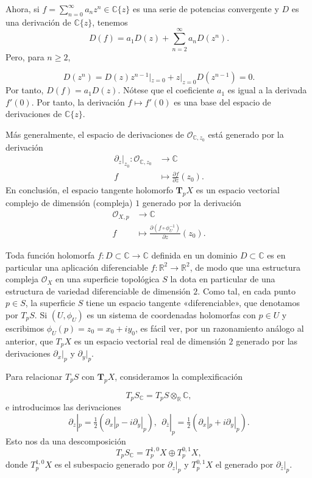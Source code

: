 \documentclass[autocontact]{gaceta}
\theoremstyle{definition} \newtheorem{defn}[thm]{Definición}
\theoremstyle{definition} \newtheorem{ejemplo}[thm]{Ejemplo}
\theoremstyle{definition} \newtheorem{ejercicio}[thm]{Ejercicio}
\def\CC{\mathbb{C}}
\def\RR{\mathbb{R}}
\def\OO{\mathscr{O}}
\begin{document}
Ahora, si $f=\sum_{n=0}^\infty a_n z^n \in \CC\{z\}$ es una serie de potencias convergente y $D$ es una derivación de $\CC\{z\}$, tenemos
\begin{equation*}
  D (f) =  a_1 D(z) + \sum_{n=2}^\infty a_n D(z^n).
\end{equation*}
Pero, para $n\geq 2$,

\begin{equation*}
  D(z^n) = D(z) z^{n-1}|_{z=0} + z|_{z=0} D(z^{n-1}) = 0.
\end{equation*}
Por tanto, $D(f) = a_1 D(z)$. Nótese que el coeficiente $a_1$ es igual a la derivada $f'(0)$. Por tanto, la derivación $f\mapsto f'(0)$ es una base del espacio de derivaciones de $\CC\{z\}$.

Más generalmente, el espacio de derivaciones de $\OO_{\CC,z_0}$ está generado por la derivación
\begin{align*}
  \partial_z|_{z_0} :\OO_{\CC,z_0} &\longrightarrow \CC \\ 
  f &\longmapsto \frac{\partial f}{\partial z}(z_0). 
  \end{align*}
  En conclusión, el espacio tangente holomorfo $\mathbf{T}_pX$ es un espacio vectorial complejo de dimensión (compleja) $1$ generado por la derivación 
\begin{align*}
  \OO_{X,p} &\longrightarrow \CC \\ 
  f &\longmapsto \frac{\partial (f\circ \phi_U^{-1})}{\partial z}(z_0). 
  \end{align*}

  Toda función holomorfa $f:D\subset \CC \rightarrow \CC$ definida en un dominio $D\subset \CC$ es en particular una aplicación diferenciable $f:\RR^2 \rightarrow \RR^2$, de modo que una estructura compleja $\OO_X$ en una superficie topológica $S$ la dota en particular de una estructura de variedad diferenciable de dimensión $2$. Como tal, en cada punto $p\in S$, la superficie $S$ tiene un espacio tangente «diferenciable», que denotamos por $T_pS$. Si $(U,\phi_U)$ es un sistema de coordenadas holomorfas con $p\in U$ y escribimos $\phi_U(p)=z_0=x_0+iy_0$, es fácil ver, por un razonamiento análogo al anterior, que $T_pX$ es un espacio vectorial real de dimensión $2$ generado por las derivaciones $\partial_x|_p$ y $\partial_y|_p$. 

  Para relacionar $T_pS$ con $\mathbf{T}_p X$, consideramos la complexificación

  \begin{equation*}
    T_pS_{\CC} = T_p S \otimes_{\RR} \CC,
  \end{equation*}
  e introducimos las derivaciones
  \begin{equation*}
    \partial_z|_p = \tfrac{1}{2}(\partial_x|_p - i \partial_y|_p), \ \ \partial_{\bar{z}}|_p = \tfrac{1}{2} (\partial_x|_p + i \partial_y|_p).
  \end{equation*}
  Esto nos da una descomposición
  \begin{equation*}
    T_p S_\CC = T_p^{1,0} X \oplus T_p^{0,1} X,   
  \end{equation*}
  donde $T_p^{1,0}X$ es el subespacio generado por $\partial_z|_p$ y $T_p^{0,1} X$ el generado por $\partial_{\bar{z}}|_p$. 
\end{document}
